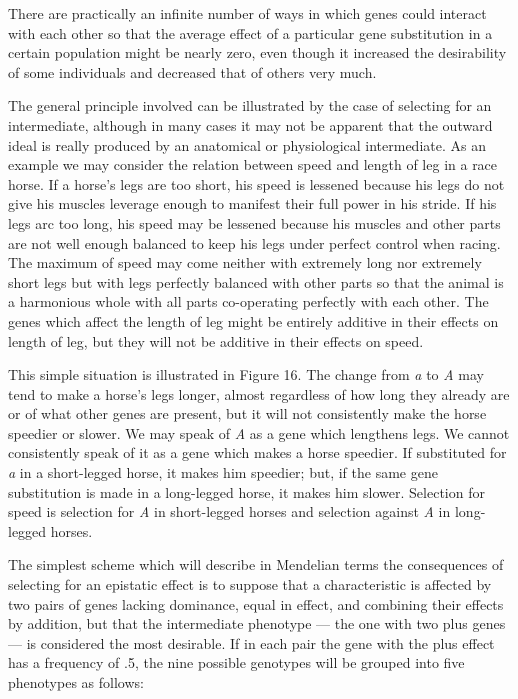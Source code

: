 There are practically an infinite number of ways in which genes
could interact with each other so that the average effect of a particular
gene substitution in a certain population might be nearly zero, even
though it increased the desirability of some individuals and decreased
that of others very much.

The general principle involved can be illustrated by the case of
selecting for an intermediate, although in many cases it may not be
apparent that the outward ideal is really produced by an anatomical or
physiological intermediate. As an example we may consider the relation
between speed and length of leg in a race horse. If a horse's legs are too
short, his speed is lessened because his legs do not give his muscles leverage
enough to manifest their full power in his stride. If his legs arc too
long, his speed may be lessened because his muscles and other parts are
not well enough balanced to keep his legs under perfect control when
racing. The maximum of speed may come neither with extremely long
nor extremely short legs but with legs perfectly balanced with other
parts so that the animal is a harmonious whole with all parts co-operating
perfectly with each other. The genes which affect the length of leg
might be entirely additive in their effects on length of leg, but they will
not be additive in their effects on speed.

This simple situation is illustrated in Figure 16. The change from \textit{a}
to \textit{A} may tend to make a horse's legs longer, almost regardless of how
long they already are or of what other genes are present, but it will not
consistently make the horse speedier or slower. We may speak of \textit{A} as a
gene which lengthens legs. We cannot consistently speak of it as a gene
which makes a horse speedier. If substituted for \textit{a} in a short-legged
horse, it makes him speedier; but, if the same gene substitution is made
in a long-legged horse, it makes him slower. Selection for speed is selection
for \textit{A} in short-legged horses and selection against \textit{A} in long-legged
horses.

\label{page135}
The simplest scheme which will describe in Mendelian terms the
consequences of selecting for an epistatic effect is to suppose that a characteristic
is affected by two pairs of genes lacking dominance, equal in
effect, and combining their effects by addition, but that the intermediate
phenotype --- the one with two plus genes --- is considered the most
desirable. If in each pair the gene with the plus effect has a frequency of
.5, the nine possible genotypes will be grouped into five phenotypes as
follows:

